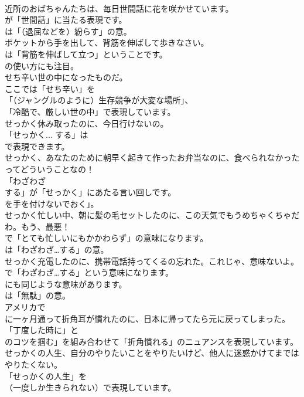 \documentclass[8pt]{extreport}
\begin{document}
\begin{CJK}{UTF8}{min}
\\	近所のおばちゃんたちは、毎日世間話に花を咲かせています。 
\\	が「世間話」に当たる表現です。
\\	は「（退屈などを）紛らす」の意。	
\\	ポケットから手を出して、背筋を伸ばして歩きなさい。 
\\	は「背筋を伸ばして立つ」ということです。
\\	の使い方にも注目。	
\\	せち辛い世の中になったものだ。 
\\	ここでは「せち辛い」を
\\	「（ジャングルのように）生存競争が大変な場所」、
\\	「冷酷で、厳しい世の中」で表現しています。	
\\	せっかく休み取ったのに、今日行けないの。 
\\	「せっかく... する」は
\\	で表現できます。	
\\	せっかく、あなたのために朝早く起きて作ったお弁当なのに、食べられなかったってどういうことなの！ 
\\	「わざわざ 
\\	する」が「せっかく」にあたる言い回しです。
\\	を手を付けないでおく」。	
\\	せっかく忙しい中、朝に髪の毛セットしたのに、この天気でもうめちゃくちゃだわ。もう、最悪！ 
\\	で「とても忙しいにもかかわらず」の意味になります。
\\	は「わざわざ…する」の意。	
\\	せっかく充電したのに、携帯電話持ってくるの忘れた。これじゃ、意味ないよ。 
\\	で「わざわざ…する」という意味になります。
\\	にも同じような意味があります。
\\	は「無駄」の意。	
\\	アメリカで
\\	に一ヶ月通って折角耳が慣れたのに、日本に帰ってたら元に戻ってしまった。 
\\	「丁度した時に」と
\\	のコツを掴む」を組み合わせて「折角慣れる」のニュアンスを表現しています。	
\\	せっかくの人生、自分のやりたいことをやりたいけど、他人に迷惑かけてまではやりたくない。 
\\	「せっかくの人生」を 
\\	（一度しか生きられない）で表現しています。

\end{CJK}
\end{document}
